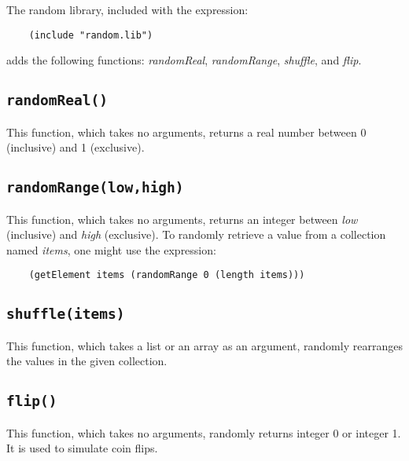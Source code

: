 The random library, included with the expression:

\begin{verbatim}
    (include "random.lib")
\end{verbatim}

adds the following functions:
{\it randomReal}, {\it randomRange}, {\it shuffle}, and {\it flip}.

\subsection*{{\tt randomReal()}}

This function,  which takes no arguments, returns a real number
between 0 (inclusive) and 1 (exclusive).

\subsection*{{\tt randomRange(low,high)}}

This function,  which takes no arguments, returns an integer
between {\it low} (inclusive) and {\it high} (exclusive).
To randomly retrieve a value from a collection named {\it items},
one might use the expression:

\begin{verbatim}
    (getElement items (randomRange 0 (length items)))
\end{verbatim}

\subsection*{{\tt shuffle(items)}}

This function, which takes a list or an array as an argument,
randomly rearranges the values in the given collection.

\subsection*{{\tt flip()}}

This function, which takes no arguments,
randomly returns integer 0 or integer 1.
It is used to simulate coin flips.
